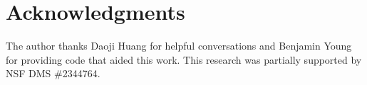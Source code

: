 \documentclass[12 pt]{amsart}
\numberwithin{equation}{section}
\theoremstyle{remark}
\begin{document}
		
				
		
		\section*{Acknowledgments}
		
		The author thanks Daoji Huang for helpful conversations and Benjamin Young for providing code that aided this work. 
		This research was partially supported by NSF DMS \#2344764.  
				
		 
		
	
\end{document}
